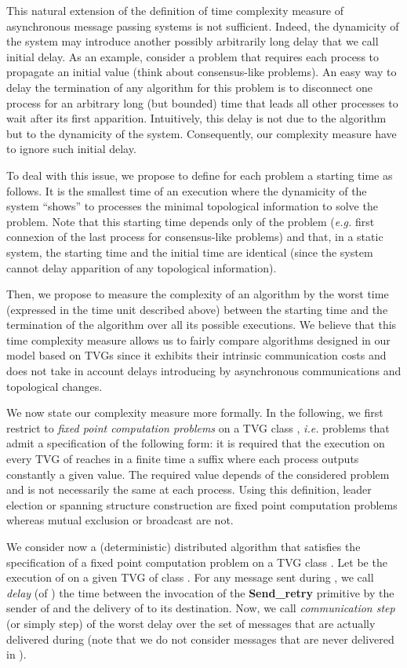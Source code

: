 \documentclass{article}
\begin{document}
This natural extension of the definition of time complexity measure of asynchronous message passing systems is not sufficient. Indeed, the dynamicity of the system may introduce another possibly arbitrarily long delay that we call initial delay. As an example, consider a problem that requires each process to propagate an initial value (think about consensus-like problems). An easy way to delay the termination of any algorithm for this problem is to disconnect one process for an arbitrary long (but bounded) time that leads all other processes to wait after its first apparition. Intuitively, this delay is not due to the algorithm but to the dynamicity of the system. Consequently, our complexity measure have to ignore such initial delay.

To deal with this issue, we propose to define for each problem a starting time as follows. It is the smallest time of an execution where the dynamicity of the system ``shows'' to processes the minimal topological information to solve the problem. Note that this starting time depends only of the problem (\emph{e.g.} first connexion of the last process for consensus-like problems) and that, in a static system, the starting time and the initial time are identical (since the system cannot delay apparition of any topological information).

Then, we propose to measure the complexity of an algorithm by the worst time (expressed in the time unit described above) between the starting time and the termination of the algorithm over all its possible executions. We believe that this time complexity measure allows us to fairly compare algorithms designed in our model based on TVGs since it exhibits their intrinsic communication costs and does not take in account delays introducing by asynchronous communications and topological changes.

We now state our complexity measure more formally. In the following, we first restrict to \emph{fixed point computation problems} on a TVG class , \emph{i.e.} problems that admit a specification of the following form: it is required that the execution on every TVG of  reaches in a finite time a suffix where each process outputs constantly a given value. The required value depends of the considered problem and is not necessarily the same at each process. Using this definition, leader election or spanning structure construction are fixed point computation problems whereas mutual exclusion or broadcast are not.  

We consider now a (deterministic) distributed algorithm  that satisfies the specification of a fixed point computation problem  on a TVG class . Let  be the execution of  on a given TVG of class . For any message  sent during , we call \emph{delay} (of ) the time between the invocation of the \textbf{Send\_retry} primitive by the sender of  and the delivery of  to its destination. Now, we call \emph{communication step} (or simply step) of  the worst delay over the set of messages that are actually delivered during  (note that we do not consider messages that are never delivered in ).
\end{document}
